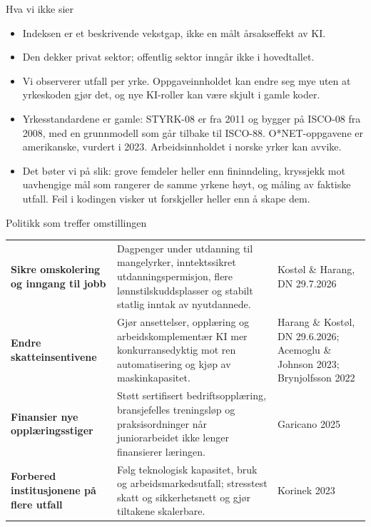 \begin{frame}{Hva vi ikke sier}
\small
\begin{itemize}\setlength{\itemsep}{6pt}
  \item Indeksen er et beskrivende vekstgap, ikke en målt årsakseffekt av KI.
  \item Den dekker privat sektor; offentlig sektor inngår ikke i hovedtallet.
  \item Vi observerer utfall per yrke. Oppgaveinnholdet kan endre seg mye uten at yrkeskoden gjør det, og nye KI-roller kan være skjult i gamle koder.
  \item Yrkesstandardene er gamle: STYRK-08 er fra 2011 og bygger på ISCO-08 fra 2008, med en grunnmodell som går tilbake til ISCO-88. O*NET-oppgavene er amerikanske, vurdert i 2023. Arbeidsinnholdet i norske yrker kan avvike.
  \item Det bøter vi på slik: grove femdeler heller enn fininndeling, kryssjekk mot uavhengige mål som rangerer de samme yrkene høyt, og måling av faktiske utfall. Feil i kodingen visker ut forskjeller heller enn å skape dem.
\end{itemize}
\end{frame}

\begin{frame}{Politikk som treffer omstillingen}
\footnotesize
\setlength{\tabcolsep}{6pt}
\renewcommand{\arraystretch}{1.5}
\begin{tabular}{p{3.6cm} p{7.4cm} p{2.6cm}}
\textbf{\textcolor{illInk}{Sikre omskolering og inngang til jobb}} & Dagpenger under utdanning til mangelyrker, inntektssikret utdanningspermisjon, flere lønnstilskuddsplasser og stabilt statlig inntak av nyutdannede. & {\tiny\textcolor{illGray}{Kostøl \& Harang, DN 29.7.2026}} \\
\textbf{\textcolor{illInk}{Endre skatteinsentivene}} & Gjør ansettelser, opplæring og arbeidskomplementær KI mer konkurransedyktig mot ren automatisering og kjøp av maskinkapasitet. & {\tiny\textcolor{illGray}{Harang \& Kostøl, DN 29.6.2026; Acemoglu \& Johnson 2023; Brynjolfsson 2022}} \\
\textbf{\textcolor{illInk}{Finansier nye opplæringsstiger}} & Støtt sertifisert bedriftsopplæring, bransjefelles treningsløp og praksisordninger når juniorarbeidet ikke lenger finansierer læringen. & {\tiny\textcolor{illGray}{Garicano 2025}} \\
\textbf{\textcolor{illInk}{Forbered institusjonene på flere utfall}} & Følg teknologisk kapasitet, bruk og arbeidsmarkedsutfall; stresstest skatt og sikkerhetsnett og gjør tiltakene skalerbare. & {\tiny\textcolor{illGray}{Korinek 2023}} \\
\end{tabular}
\end{frame}

